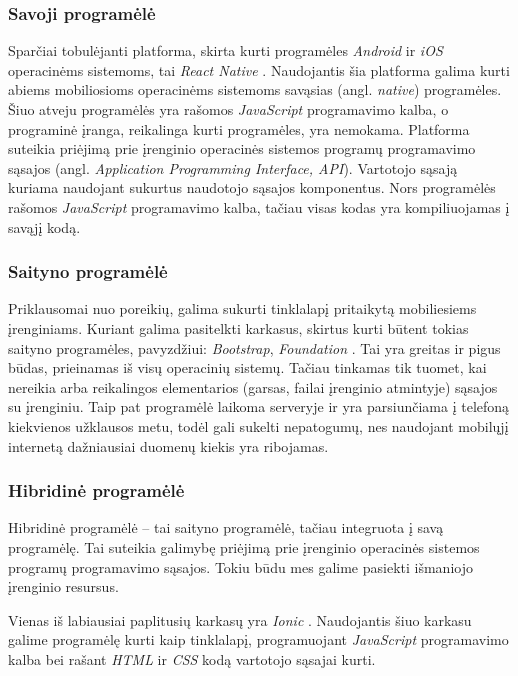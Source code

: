 \documentclass{VUMIFPSbakalaurinis}
\begin{document}
\subsubsection{Savoji programėlė}

Sparčiai tobulėjanti platforma, skirta kurti programėles \textit{Android} ir \textit{iOS} operacinėms sistemoms, tai \textit{React Native} \cite{reactNative}. Naudojantis šia platforma galima kurti abiems mobiliosioms operacinėms sistemoms savąsias (angl. \textit{native}) programėles. Šiuo atveju programėlės yra rašomos \textit{JavaScript} programavimo kalba, o programinė įranga, reikalinga kurti programėles, yra nemokama. Platforma suteikia priėjimą prie įrenginio operacinės sistemos programų programavimo sąsajos (angl. \textit{Application Programming Interface, API}). Vartotojo sąsają kuriama naudojant sukurtus naudotojo sąsajos komponentus. Nors programėlės rašomos \textit{JavaScript} programavimo kalba, tačiau visas kodas yra kompiliuojamas į savąjį kodą.

\subsubsection{Saityno programėlė} \label{webApp}

Priklausomai nuo poreikių, galima sukurti tinklalapį pritaikytą mobiliesiems įrenginiams. Kuriant galima pasitelkti karkasus, skirtus kurti būtent tokias saityno programėles, pavyzdžiui: \textit{Bootstrap}, \textit{Foundation} \cite{cssFrameworks}. Tai yra greitas ir pigus būdas, prieinamas iš visų operacinių sistemų. Tačiau tinkamas tik tuomet, kai nereikia arba reikalingos elementarios (garsas, failai įrenginio atmintyje) sąsajos su įrenginiu. Taip pat programėlė laikoma serveryje ir yra parsiunčiama į telefoną kiekvienos užklausos metu, todėl gali sukelti nepatogumų, nes naudojant mobilųjį internetą dažniausiai duomenų kiekis yra ribojamas.

\subsubsection{Hibridinė programėlė}

Hibridinė programėlė – tai saityno programėlė, tačiau integruota į 	savą programėlę. Tai suteikia galimybę priėjimą prie įrenginio operacinės sistemos programų programavimo sąsajos. Tokiu būdu mes galime pasiekti išmaniojo įrenginio resursus.

Vienas iš labiausiai paplitusių karkasų yra \textit{Ionic} \cite{hybridFrameworks}. Naudojantis šiuo karkasu galime programėlę kurti kaip tinklalapį, programuojant \textit{JavaScript} programavimo kalba bei rašant \textit{HTML} ir \textit{CSS} kodą vartotojo sąsajai kurti.
\end{document}
